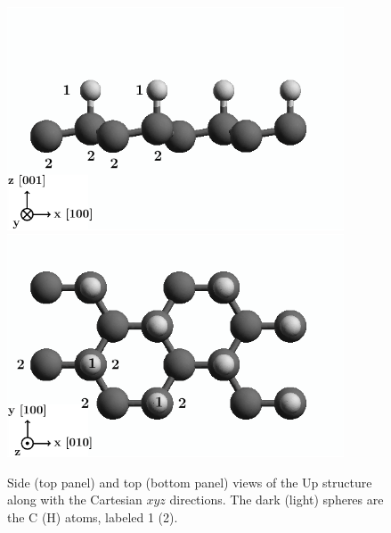 \documentclass[floatfix,prb,aps,superscriptaddress,showpacs,11pt,preprint,letterpaper]{revtex4}
\def\tama{10cm}
\begin{document}
\begin{figure}[ht!]
    \centering
    \includegraphics[width=\tama]{figures/upstruc2}
    \\
    \includegraphics[width=\tama]{figures/upstruc1}
    \caption{Side (top panel) and top (bottom panel) views of the Up
      structure along with the 
      Cartesian $xyz$ directions. The dark (light) spheres are the C (H) atoms,
      labeled 1 (2).
}
    \label{fig:up-struc}
\end{figure}
\end{document}
